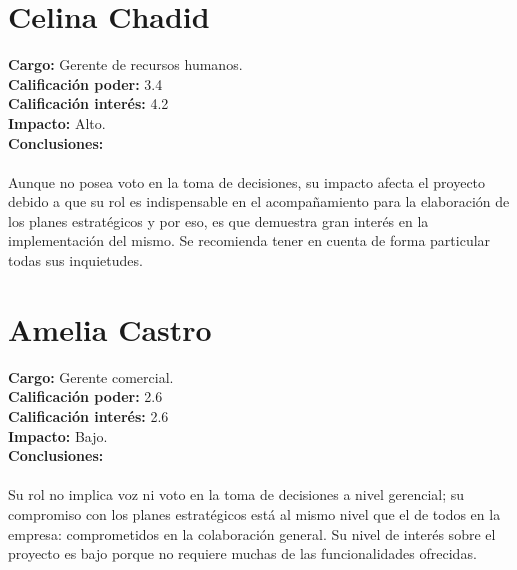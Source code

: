 \section{Celina Chadid}
%
\noindent \textbf{Cargo:} Gerente de recursos humanos.\\
%
\textbf{Calificaci\'on poder:} 3.4\\
%
\textbf{Calificaci\'on inter\'es:} 4.2\\
%
\textbf{Impacto:} Alto.\\
%
\textbf{Conclusiones:}\\
%
\\Aunque no posea voto en la toma de decisiones, su impacto afecta el proyecto debido a que su rol es indispensable
en el acompa\~namiento para la elaboraci\'on de los planes estrat\'egicos y por eso, es que demuestra gran
inter\'es en la implementaci\'on del mismo. Se recomienda tener en cuenta de forma particular todas sus 
inquietudes.\\
%
\section{Amelia Castro}
%
\noindent \textbf{Cargo:} Gerente comercial.\\
%
\textbf{Calificaci\'on poder:} 2.6\\
%
\textbf{Calificaci\'on inter\'es:} 2.6\\
%
\textbf{Impacto:} Bajo.\\
%
\textbf{Conclusiones:}\\
%
\\Su rol no implica voz ni voto en la toma de decisiones a nivel gerencial; su compromiso con los planes
estrat\'egicos est\'a al mismo nivel que el de todos en la empresa: comprometidos en la colaboraci\'on general.
Su nivel de inter\'es sobre el proyecto es bajo porque no requiere muchas de las funcionalidades ofrecidas.\\